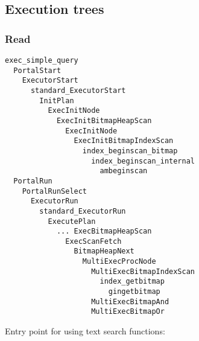 \documentclass[
]{article}
\begin{document}
\hypertarget{execution-trees}{%
\subsection{Execution trees}\label{execution-trees}}

\hypertarget{read}{%
\subsubsection{Read}\label{read}}

\begin{verbatim}
exec_simple_query
  PortalStart
    ExecutorStart
      standard_ExecutorStart
        InitPlan
          ExecInitNode
            ExecInitBitmapHeapScan
              ExecInitNode
                ExecInitBitmapIndexScan
                  index_beginscan_bitmap
                    index_beginscan_internal
                      ambeginscan
  PortalRun
    PortalRunSelect
      ExecutorRun
        standard_ExecutorRun
          ExecutePlan
            ... ExecBitmapHeapScan
              ExecScanFetch
                BitmapHeapNext
                  MultiExecProcNode
                    MultiExecBitmapIndexScan
                      index_getbitmap
                        gingetbitmap
                    MultiExecBitmapAnd
                    MultiExecBitmapOr
\end{verbatim}

Entry point for using text search functions:
\end{document}
